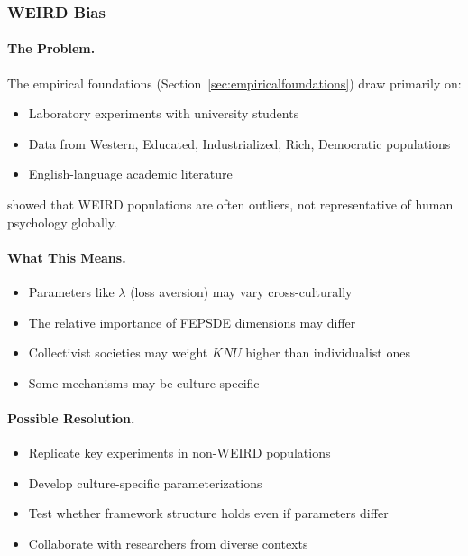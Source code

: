 \documentclass[12pt,a4paper]{article}
\begin{document}
\subsubsection{WEIRD Bias}

\paragraph{The Problem.}
The empirical foundations (Section~\ref{sec:empiricalfoundations}) draw primarily on:
\begin{itemize}
  \item Laboratory experiments with university students
  \item Data from Western, Educated, Industrialized, Rich, Democratic populations
  \item English-language academic literature
\end{itemize}

\citet{henrich2010} showed that WEIRD populations are often outliers,
not representative of human psychology globally.

\paragraph{What This Means.}
\begin{itemize}
  \item Parameters like $\lambda$ (loss aversion) may vary cross-culturally
  \item The relative importance of FEPSDE dimensions may differ
  \item Collectivist societies may weight $KNU$ higher than individualist ones
  \item Some mechanisms may be culture-specific
\end{itemize}

\paragraph{Possible Resolution.}
\begin{itemize}
  \item Replicate key experiments in non-WEIRD populations
  \item Develop culture-specific parameterizations
  \item Test whether framework structure holds even if parameters differ
  \item Collaborate with researchers from diverse contexts
\end{itemize}
\end{document}
